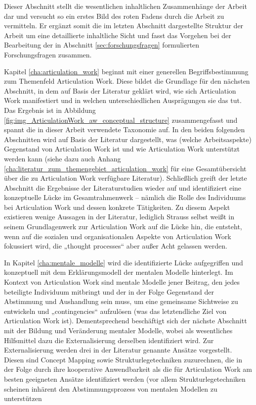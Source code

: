 Dieser Abschnitt stellt die wesentlichen inhaltlichen Zusammenhänge der Arbeit dar und versucht so ein erstes Bild des roten Fadens durch die Arbeit zu vermitteln. Er ergänzt somit die im letzten Abschnitt dargestellte Struktur der Arbeit um eine detaillierte inhaltliche Sicht und fasst das Vorgehen bei der Bearbeitung der in Abschnitt \ref{sec:forschungsfragen} formulierten Forschungsfragen zusammen.

Kapitel \ref{cha:articulation_work} beginnt mit einer generellen Begriffsbestimmung zum Themenfeld Articulation Work. Diese bildet die Grundlage für den nächsten Abschnitt, in dem auf Basis der Literatur geklärt wird, wie sich Articulation Work manifestiert und in welchen unterschiedlichen Ausprägungen sie das tut. Das Ergebnis ist in Abbildung \ref{fig:img_ArticulationWork_aw_conceptual_structure} zusammengefasst und spannt die in dieser Arbeit verwendete Taxonomie auf. In den beiden folgenden Abschnitten wird auf Basis der Literatur dargestellt, was (welche Arbeitsaspekte) Gegenstand von Articulation Work ist und wie Articulation Work unterstützt werden kann (siehe dazu auch Anhang \ref{cha:literatur_zum_themengebiet_articulation_work} für eine Gesamtübersicht über die zu Articulation Work verfügbare Literatur). Schließlich greift der letzte Abschnitt die Ergebnisse der Literaturstudien wieder auf und identifiziert eine konzeptuelle Lücke im Gesamtrahmenwerk -- nämlich die Rolle des Individuums bei Articulation Work und dessen konkrete Tätigkeiten. Zu diesem Aspekt existieren wenige Aussagen in der Literatur, lediglich Strauss selbst weißt in seinem Grundlagenwerk zur Articulation Work auf die Lücke hin, die entsteht, wenn auf die sozialen und organisationalen Aspekte von Articulation Work fokussiert wird, die „thought processes“ aber außer Acht gelassen werden.

In Kapitel \ref{cha:mentale_modelle} wird die identifizierte Lücke aufgegriffen und konzeptuell mit dem Erklärungsmodell der mentalen Modelle hinterlegt. Im Kontext von Articulation Work sind mentale Modelle jener Beitrag, den jedes beteiligte Individuum mitbringt und der in der Folge Gegenstand der Abstimmung und Aushandlung sein muss, um eine gemeinsame Sichtweise zu entwickeln und „contingencies“ aufzulösen (was das letztendliche Ziel von Articulation Work ist). Dementsprechend beschäftigt sich der nächste Abschnitt mit der Bildung und Veränderung mentaler Modelle, wobei als wesentliches Hilfsmittel dazu die Externalisierung derselben identifiziert wird. Zur Externalisierung werden drei in der Literatur genannte Ansätze vorgestellt. Diesen sind Concept Mapping sowie Strukturlegetechniken zuzurechnen, die in der Folge durch ihre kooperative Anwendbarkeit als die für Articulation Work am besten geeigneten Ansätze identifiziert werden (vor allem Strukturlegetechniken scheinen inhärent den Abstimmungsprozess von mentalen Modellen zu unterstützen

